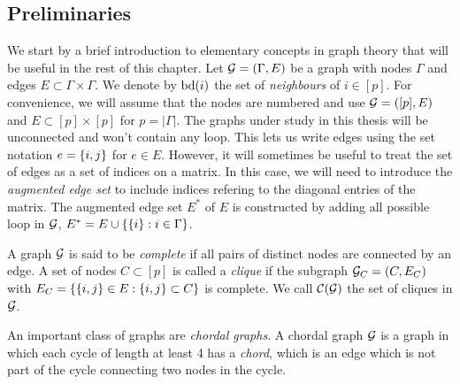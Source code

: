 \subsection{Preliminaries}

We start by a brief introduction to elementary concepts in graph theory that will be useful in the rest of this chapter. Let ${\mathcal{G}} = (\Gamma, E)$ be a graph with nodes $\Gamma$ and edges $E \subset \Gamma \times \Gamma$. We denote by ${\textrm{bd}}(i)$ the set of \textit{neighbours} of $i \in [p]$. For convenience, we will assume that the nodes are numbered and use  ${\mathcal{G}} = ([p], E)$ and $E \subset [p] \times [p]$ for $p = |\Gamma|$. The graphs under study in this thesis will be unconnected and won't contain any loop. This lets us write edges using the set notation $e = {\left\{i, j\right\}}$ for $e \in E$. However, it will sometimes be useful to treat the set of edges as a set of indices on a matrix. In this case, we will need to introduce the \textit{augmented edge set} to include indices refering to the diagonal entries of the matrix. The augmented edge set $E^*$ of $E$ is constructed by adding all possible loop in ${\mathcal{G}}$, $E^* = E \cup {\left\{ {\left\{i\right\}} : i \in \Gamma \right\}}$.

A graph ${\mathcal{G}}$ is said to be \textit{complete} if all pairs of distinct nodes are connected by an edge. A set of nodes $C \subset [p]$ is called a \textit{clique} if the subgraph ${\mathcal{G}}_C = (C, E_C)$ with $E_C = {\left\{ {\left\{i, j\right\}} \in E : {\left\{i, j\right\}} \subset C \right\}}$ is complete. We call ${\mathcal{C}}({\mathcal{G}})$ the set of cliques in ${\mathcal{G}}$.

An important class of graphs are \textit{chordal graphs}. A chordal graph ${\mathcal{G}}$ is a graph in which each cycle of length at least 4 has a \textit{chord}, which is an edge which is not part of the cycle connecting two nodes in the cycle.

